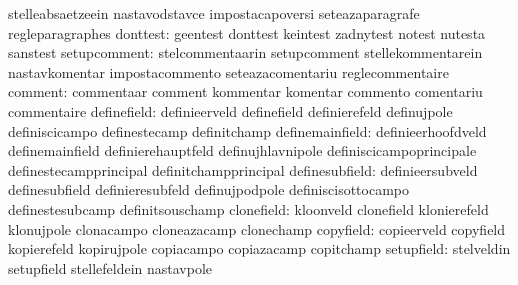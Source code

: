                                   stelleabsaetzeein                nastavodstavce
                                  impostacapoversi                 seteazaparagrafe
                                  regleparagraphes
                        donttest: geentest                         donttest
                                  keintest                         zadnytest
                                  notest                           nutesta
                                  sanstest
                    setupcomment: stelcommentaarin                 setupcomment
                                  stellekommentarein               nastavkomentar
                                  impostacommento                  seteazacomentariu
                                  reglecommentaire
                         comment: commentaar                       comment
                                  kommentar                        komentar
                                  commento                         comentariu
                                  commentaire
                     definefield: definieerveld                    definefield
                                  definierefeld                    definujpole
                                  definiscicampo                   definestecamp
                                  definitchamp
                 definemainfield: definieerhoofdveld               definemainfield
                                  definierehauptfeld               definujhlavnipole
                                  definiscicampoprincipale         definestecampprincipal
                                  definitchampprincipal
                  definesubfield: definieersubveld                 definesubfield
                                  definieresubfeld                 definujpodpole
                                  definiscisottocampo              definestesubcamp
                                  definitsouschamp
                      clonefield: kloonveld                        clonefield
                                  klonierefeld                     klonujpole
                                  clonacampo                       cloneazacamp
                                  clonechamp
                       copyfield: copieerveld                      copyfield
                                  kopierefeld                      kopirujpole
                                  copiacampo                       copiazacamp
                                  copitchamp
                      setupfield: stelveldin                       setupfield
                                  stellefeldein                    nastavpole
